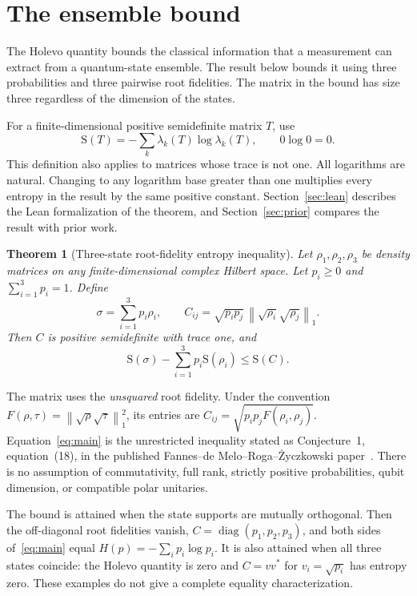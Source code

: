 \documentclass[11pt,a4paper]{article}
\newtheorem{theorem}{Theorem}
\newcommand{\Ent}{\mathrm{S}}
\newcommand{\diag}{\operatorname{diag}}
\newcommand{\normone}[1]{\left\lVert #1\right\rVert_1}
\begin{document}
\section{The ensemble bound}

The Holevo quantity bounds the classical information that a measurement
can extract from a quantum-state ensemble. The result below bounds it using
three probabilities and three pairwise root fidelities. The matrix in the
bound has size three regardless of the dimension of the states.

For a finite-dimensional positive semidefinite matrix $T$, use
\[
 \Ent(T)=-\sum_k \lambda_k(T)\log\lambda_k(T),\qquad 0\log0=0.
\]
This definition also applies to matrices whose trace is not one. All
logarithms are natural. Changing to any logarithm base greater than one
multiplies every entropy in the result by the same positive constant.
Section~\ref{sec:lean} describes the Lean formalization of the theorem, and
Section~\ref{sec:prior} compares the result with prior work.

\begin{theorem}[Three-state root-fidelity entropy inequality]\label{thm:main}
Let $\rho_1,\rho_2,\rho_3$ be density matrices on any finite-dimensional
complex Hilbert space. Let $p_i\ge0$ and $\sum_{i=1}^3p_i=1$. Define
\[
 \sigma=\sum_{i=1}^3p_i\rho_i,
 \qquad
 C_{ij}=\sqrt{p_i p_j}\,
       \normone{\sqrt{\rho_i}\sqrt{\rho_j}}.
\]
Then $C$ is positive semidefinite with trace one, and
\begin{equation}\label{eq:main}
 \Ent(\sigma)-\sum_{i=1}^3p_i\Ent(\rho_i)\le\Ent(C).
\end{equation}
\end{theorem}

The matrix uses the \emph{unsquared} root fidelity. Under the convention
$F(\rho,\tau)=\normone{\sqrt\rho\sqrt\tau}^2$, its entries are
$C_{ij}=\sqrt{p_i p_j F(\rho_i,\rho_j)}$.
Equation~\eqref{eq:main} is the unrestricted inequality stated as
Conjecture~1, equation~(18), in the published Fannes--de Melo--Roga--\.{Z}yczkowski
paper~\cite{fmrz}. There is no assumption of commutativity, full rank,
strictly positive probabilities, qubit dimension, or compatible polar
unitaries.

The bound is attained when the state supports are mutually orthogonal.
Then the off-diagonal root fidelities vanish, $C=\diag(p_1,p_2,p_3)$,
and both sides of~\eqref{eq:main} equal $H(p)=-\sum_i p_i\log p_i$.
It is also attained when all three states coincide: the Holevo quantity
is zero and $C=vv^*$ for $v_i=\sqrt{p_i}$ has entropy zero.
These examples do not give a complete equality characterization.
\end{document}
